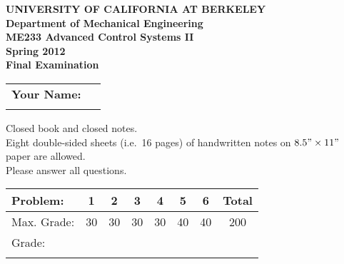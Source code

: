 \documentclass[letterpaper,12pt]{article}
\begin{document}
\begin{center}
    {\bf UNIVERSITY OF CALIFORNIA AT BERKELEY}\\
    {\bf Department of Mechanical Engineering}\\
    {\bf ME233  Advanced Control Systems II\\
    Spring 2012} \\ \vspace{2ex}
    {\Large \bf{ Final Examination }}
\end{center}

\begin{tabular}{|l l|}
    \hline
    {\bf Your Name:} & \hspace{4in}$\:$\\
    $\:$ & $\:$\\
    \hline
\end{tabular}

$\:$\\

\noindent
Closed book and closed notes. \\
Eight double-sided sheets (i.e.\ 16 pages) of handwritten notes on $8.5" \times 11"$ paper are allowed. \\
Please answer all questions.\\

\begin{tabular}{|l | c | c | c | c | c | c | c | }
    \hline
    Problem: & 1 & 2 & 3 & 4 & 5 & 6 & Total \\ \hline
    Max. Grade: & 30 & 30 & 30 & 30 & 40 & 40 & 200 \\ \hline
    Grade: & \hspace{.5in} &\hspace{.5in} &\hspace{.5in} &\hspace{.5in} &\hspace{.5in} &\hspace{.5in} &\hspace{.5in} \\
    & & & & & & & \\
    \hline
\end{tabular}



\newpage %

\newpage %

\newpage %

\newpage %

\newpage %

\newpage %
\end{document}

